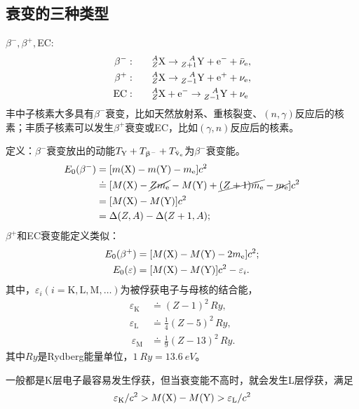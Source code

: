 \subsection{\betaray 衰变的三种类型}

$\beta^-,\beta^+,$EC:
\begin{align*}
	\beta^-:&\qquad{^A_Z\mathrm{X}} \to {^{\quad\!A}_{Z+1}\mathrm{Y}} + \mathrm{e}^- + \bar\nu_{\mathrm{e}},\\
	\beta^+:&\qquad{^A_Z\mathrm{X}} \to {^{\quad\!A}_{Z-1}\mathrm{Y}} + \mathrm{e}^+ + \nu_{\mathrm{e}},\\
	\mathrm{EC}:&\qquad{^A_Z\mathrm{X}} + \mathrm{e}^- \to {^{\quad\!A}_{Z-1}\mathrm{Y}} + \nu_{\mathrm{e}}
\end{align*}
丰中子核素大多具有$\beta^-$衰变，比如天然放射系、重核裂变、$(n,\gamma)$反应后的核素；丰质子核素可以发生$\beta^+$衰变或EC，比如$(\gamma,n)$反应后的核素。

定义：$\beta^-$衰变放出的动能$T_{\mathrm{Y}} + T_{\upbeta^-} + T_{\bar\upnu_{\mathrm{e}}}$为$\beta^-$衰变能。
\begin{align}\notag
	E_0(\beta^-) &= [m(\mathrm{X}) - m(\mathrm{Y}) - m_{\mathrm{e}}]c^2\\\notag
	&\doteq [M(\mathrm{X}) - \cancel{Zm_{\mathrm{e}}} - M(\mathrm{Y}) + \cancel{(Z + 1)m_{\mathrm{e}}} - \cancel{m_{\mathrm{e}}}]c^2\\
	&= [M(\mathrm{X}) - M(\mathrm{Y})]c^2\\\notag
	&= \Delta(Z,A) - \Delta(Z + 1,A);
\end{align}
$\beta^+$和EC衰变能定义类似：
\begin{align}
	E_0(\beta^+) &= [M(\mathrm{X}) - M(\mathrm{Y}) - 2m_{\mathrm{e}}]c^2;\\
	E_0(\varepsilon) &= [M(\mathrm{X}) - M(\mathrm{Y})]c^2 - \varepsilon_i.
\end{align}
其中，$\varepsilon_i(i = \mathrm{K,L,M,}\ldots)$为被俘获电子与母核的结合能，
\begin{align*}
	\varepsilon_{\mathrm K} &\doteq (Z - 1)^2\,\unit{Ry},\\
	\varepsilon_{\mathrm L} &\doteq \frac14(Z - 5)^2\,\unit{Ry},\\\
	\varepsilon_{\mathrm M} &\doteq \frac19(Z - 13)^2\,\unit{Ry}.
\end{align*}
其中$\unit{Ry}$是Rydberg能量单位，$\qty{1}{Ry} = \qty{13.6}{eV}$。

一般都是K层电子最容易发生俘获，但当衰变能不高时，就会发生L层俘获，满足
\begin{equation}\label{eq:nrd-l-shell-capture-window}
	\varepsilon_\mathrm K / c^2 > M(\mathrm{X}) - M(\mathrm{Y}) > \varepsilon_\mathrm L / c^2
\end{equation}

